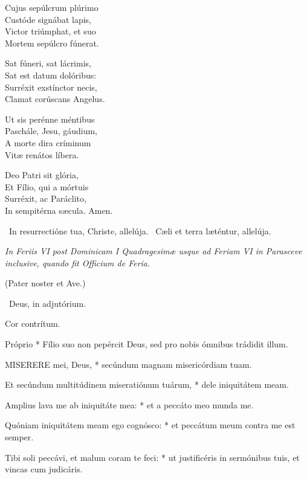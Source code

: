 Cujus sepúlcrum plúrimo\\
Custóde signábat lapis,\\
Victor triúmphat, et suo\\
Mortem sepúlcro fúnerat.

Sat fúneri, sat lácrimis,\\
Sat est datum dolóribus:\\
Surréxit exstínctor necis,\\
Clamat corúscans Angelus.

Ut sis perénne méntibus\\
Paschále, Jesu, gáudium,\\
A morte dira críminum\\
Vitæ renátos líbera.

Deo Patri sit glória,\\
Et Fílio, qui a mórtuis\\
Surréxit, ac Paráclito,\\
In sempitérna sæcula. Amen.

\V\ In resurrectióne tua, Christe, allelúja. \R\ Cæli et terra læténtur, allelúja.



\sectionornament


\textit{In Feriis VI post Dominicam I Quadragesimæ usque ad Feriam VI in Parasceve inclusive, quando fit Officium de Feria.}

(Pater noster et Ave.)

\V\ Deus, in adjutórium.

 Cor contrítum.


 Próprio * Fílio suo non pepércit Deus, sed pro nobis ómnibus trádidit illum.


\lettrine[lines=2]{M}{ISERERE} mei, Deus, * secúndum magnam misericórdiam tuam.

Et secúndum multitúdinem miseratiónum tuárum, * dele iniquitátem meam.

Amplius lava me ab iniquitáte mea: * et a peccáto meo munda me.

Quóniam iniquitátem meam ego cognósco: * et peccátum meum contra me est semper.

Tibi soli peccávi, et malum coram te feci: * ut justificéris in sermónibus tuis, et vincas cum judicáris.

